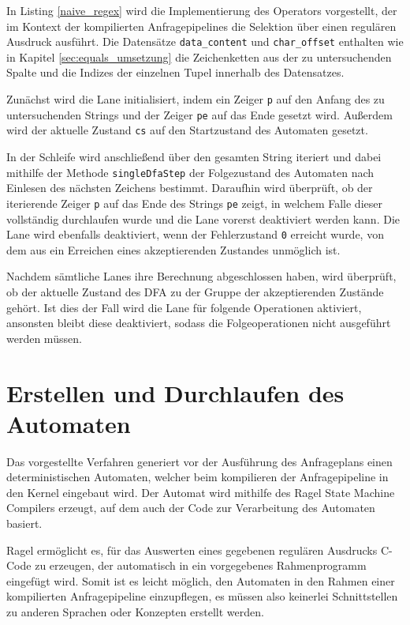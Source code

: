 In Listing \ref{naive_regex} wird die Implementierung des Operators vorgestellt, der im Kontext der kompilierten Anfragepipelines die Selektion über einen regulären Ausdruck ausführt.
Die Datensätze \texttt{data\_content} und \texttt{char\_offset} enthalten wie in Kapitel \ref{sec:equals_umsetzung} die Zeichenketten aus der zu untersuchenden Spalte und die Indizes der einzelnen Tupel innerhalb des Datensatzes.

Zunächst wird die Lane initialisiert, indem ein Zeiger \texttt{p} auf den Anfang des zu untersuchenden Strings und der Zeiger \texttt{pe} auf das Ende gesetzt wird.
Außerdem wird der aktuelle Zustand \texttt{cs} auf den Startzustand des Automaten gesetzt.

In der Schleife wird anschließend über den gesamten String iteriert und dabei mithilfe der Methode \texttt{singleDfaStep} der Folgezustand des Automaten nach Einlesen des nächsten Zeichens bestimmt.
Daraufhin wird überprüft, ob der iterierende Zeiger \texttt{p} auf das Ende des Strings \texttt{pe} zeigt, in welchem Falle dieser vollständig durchlaufen wurde und die Lane vorerst deaktiviert werden kann.
Die Lane wird ebenfalls deaktiviert, wenn der Fehlerzustand \texttt{0} erreicht wurde, von dem aus ein Erreichen eines akzeptierenden Zustandes unmöglich ist.

Nachdem sämtliche Lanes ihre Berechnung abgeschlossen haben, wird überprüft, ob der aktuelle Zustand des DFA zu der Gruppe der akzeptierenden Zustände gehört.
Ist dies der Fall wird die Lane für folgende Operationen aktiviert, ansonsten bleibt diese deaktiviert, sodass die Folgeoperationen nicht ausgeführt werden müssen.

\section{Erstellen und Durchlaufen des Automaten}

Das vorgestellte Verfahren generiert vor der Ausführung des Anfrageplans einen deterministischen Automaten, welcher beim kompilieren der Anfragepipeline in den Kernel eingebaut wird.
Der Automat wird mithilfe des Ragel State Machine Compilers \cite{Thurston2009} erzeugt, auf dem auch der Code zur Verarbeitung des Automaten basiert.

Ragel ermöglicht es, für das Auswerten eines gegebenen regulären Ausdrucks C-Code zu erzeugen, der automatisch in ein vorgegebenes Rahmenprogramm eingefügt wird.
Somit ist es leicht möglich, den Automaten in den Rahmen einer kompilierten Anfragepipeline einzupflegen, es müssen also keinerlei Schnittstellen zu anderen Sprachen oder Konzepten erstellt werden.

